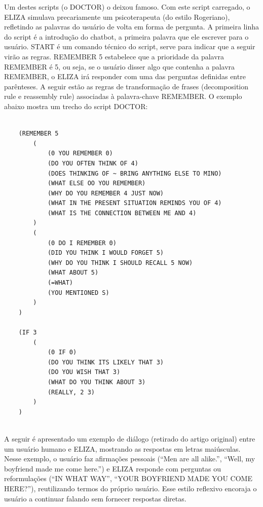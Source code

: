 \documentclass[14pt,a4paper,oneside]{book}
\begin{document}
Um destes scripts (o DOCTOR) o deixou famoso. Com este script carregado, o ELIZA simulava precariamente um psicoterapeuta (do estilo Rogeriano), refletindo as palavras do usuário de volta em forma de pergunta. A primeira linha do script é a introdução do chatbot, a primeira palavra que ele escrever para o usuário. START é um comando técnico do script, serve para indicar que a seguir virão as regras. REMEMBER 5 estabelece que a prioridade da palavra REMEMBER é 5, ou seja, se o usuário disser algo que contenha a palavra REMEMBER, o ELIZA irá responder com uma das perguntas definidas entre parênteses. A seguir estão as regras de transformação de frases (decomposition rule e reassembly rule) associadas à palavra-chave REMEMBER. O exemplo abaixo mostra um trecho do script DOCTOR:

\begin{verbatim}
		
	(REMEMBER 5 
		(
			(0 YOU REMEMBER 0) 
			(DO YOU OFTEN THINK OF 4) 
			(DOES THINKING OF ~ BRING ANYTHING ELSE TO MINO) 
			(WHAT ELSE OO YOU REMEMBER)
			(WHY DO YOU REMEMBER 4 JUST NOW) 
			(WHAT IN THE PRESENT SITUATION REMINDS YOU OF 4) 
			(WHAT IS THE CONNECTION BETWEEN ME AND 4)
		) 
		(
			(0 DO I REMEMBER 0) 
			(DID YOU THINK I WOULD FORGET 5) 
			(WHY DO YOU THINK I SHOULD RECALL 5 NOW) 
			(WHAT ABOUT 5) 
			(=WHAT) 
			(YOU MENTIONED S)
		) 
	) 
	
	(IF 3 
		(
			(0 IF 0) 
			(DO YOU THINK ITS LIKELY THAT 3) 
			(DO YOU WISH THAT 3) 
			(WHAT DO YOU THINK ABOUT 3) 
			(REALLY, 2 3)
		)
	) 
	

\end{verbatim}


A seguir é apresentado um exemplo de diálogo (retirado do artigo original) entre um usuário humano e ELIZA, mostrando as respostas em letras maiúsculas. Nesse exemplo, o usuário faz afirmações pessoais (“Men are all alike.”, “Well, my boyfriend made me come here.”) e ELIZA responde com perguntas ou reformulações (“IN WHAT WAY”, “YOUR BOYFRIEND MADE YOU COME HERE?”), reutilizando termos do próprio usuário. Esse estilo reflexivo encoraja o usuário a continuar falando sem fornecer respostas diretas.
\end{document}

